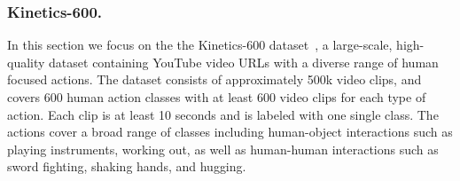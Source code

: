\documentclass[letterpaper]{article} \usepackage{aaai21}  \usepackage{times}  \usepackage{helvet} \usepackage{courier}  \usepackage[hyphens]{url}  \usepackage{graphicx} \urlstyle{rm} \def\UrlFont{\rm}  \usepackage{natbib}  \usepackage{caption} \frenchspacing  \setlength{\pdfpagewidth}{8.5in}  \setlength{\pdfpageheight}{11in}
\begin{document}
\subsubsection{Kinetics-600.} 
 In this section we focus on the 
the Kinetics-600 dataset~\cite{carreira2017quo}, a large-scale, high-quality dataset containing YouTube video URLs with 
a diverse range of human focused actions. The dataset consists of approximately 500k video clips, and covers 600 human action classes with at least 600 video clips for each type of action. Each clip is at least 10 seconds and is labeled with one single class. The actions cover a broad range of classes including human-object interactions such as playing instruments, working out, as well as human-human interactions such as sword fighting, shaking hands, and hugging.

\begin{table}[t!]
\setlength{\extrarowheight}{1pt}
\end{table}
\end{document}

